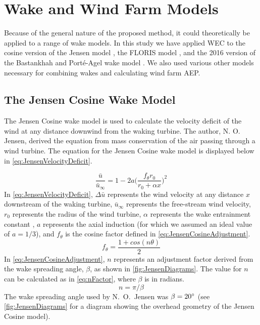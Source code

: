 \documentclass[a4paper]{jpconf}
\begin{document}
\section{Wake and Wind Farm Models}
Because of the general nature of the proposed method, it could theoretically be applied to a range of wake models. In this study we have applied WEC to the cosine version of the Jensen model \cite{jensen1983}, the FLORIS model \cite{gebraad2014,thomas2017-Improving-FLORIS}, and the 2016 version of the Bastankhah and Port\'e-Agel wake model \cite{bastankhah2016}. We also used various other models necessary for combining wakes and calculating wind farm AEP.

\subsection{The Jensen Cosine Wake Model}
The Jensen Cosine wake model is used to calculate the velocity deficit of the wind at any distance downwind from the waking turbine. The author, N. O. Jensen, derived the equation from mass conservation of the air passing through a wind turbine. The equation for the Jensen Cosine wake model is displayed below in \cref{eq:JensenVelocityDeficit}.

\begin{equation}
    \frac{ \bar{u}}{\bar{u}_\infty} = 1 - 2a \bigg(\frac{f_\theta r_0}{r_0 + \alpha x} \bigg)^2
    \label{eq:JensenVelocityDeficit}
\end{equation}
%
In \cref{eq:JensenVelocityDeficit}, $\Delta \bar{u}$ represents the wind velocity at any distance $x$ downstream of the waking turbine, $\bar{u}_\infty$ represents the free-stream wind velocity, $r_0$ represents the radius of the wind turbine, $\alpha$ represents the wake entrainment constant \cite{jensen1983}, $a$ represents the axial induction (for which we assumed an ideal value of $a = 1/3$), and $f_\theta$ is the cosine factor defined in \cref{eq:JensenCosineAdjustment}.
%
\begin{equation}
f_\theta = \frac{1 + cos(n\theta)}{2}
\label{eq:JensenCosineAdjustment}
\end{equation}
%
In \cref{eq:JensenCosineAdjustment}, $n$ represents an adjustment factor derived from the wake spreading angle, $\beta$, as shown in \cref{fig:JensenDiagrams}. The value for $n$ can be calculated as in \cref{eq:nFactor}, where $\beta$ is in radians.
%
\begin{equation}
n = \pi / \beta
\label{eq:nFactor}
\end{equation}
%
The wake spreading angle used by N.~O.~Jensen was $\beta = 20 \degree$  \cite{jensen1983} (see \cref{fig:JensenDiagrams} for a diagram showing the overhead geometry of the Jensen Cosine model).
\end{document}
